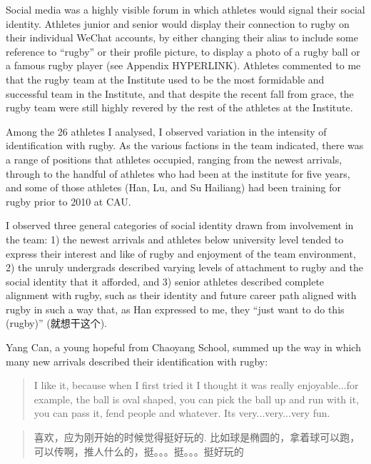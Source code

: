 \begin{CJK}{UTF8}{gbsn}
Social media was a highly visible forum in which athletes would signal their social identity.  Athletes junior and senior would display their connection to rugby on their individual WeChat accounts, by either changing their alias to include some reference to ``rugby'' or their profile picture, to display a photo of a rugby ball or a famous rugby player (see Appendix HYPERLINK).  Athletes commented to me that the rugby team at the Institute used to be the most formidable and successful team in the Institute, and that despite the recent fall from grace, the rugby team were still highly revered by the rest of the athletes at the Institute.

Among the 26 athletes I analysed, I observed variation in the intensity of identification with rugby.  As the various factions in the team indicated, there was a range of positions that athletes occupied, ranging from the newest arrivals, through to the handful of athletes who had been at the institute for five years, and some of those athletes (Han, Lu, and Su Hailiang) had been training for rugby prior to 2010 at CAU.

I observed three general categories of social identity drawn from involvement in the team: 1) the newest arrivals and athletes below university level tended to express their interest and like of rugby and enjoyment of the team environment, 2) the unruly undergrads described varying levels of attachment to rugby and the social identity that it afforded, and 3) senior athletes described complete alignment with rugby, such as their identity and future career path aligned with rugby in such a way that, as Han expressed to me, they ``just want to do this (rugby)'' (就想干这个).

Yang Can, a young hopeful from Chaoyang School, summed up the way in which many new arrivals described their identification with rugby:

      \begin{quotation}
        I like it, because when I first tried it I thought it was really enjoyable...for example, the ball is oval shaped, you can pick the ball up and run with it, you can pass it, fend people and whatever.  Its very...very...very fun.
      \end{quotation}

      \begin{quotation}
        喜欢，应为刚开始的时候觉得挺好玩的.	比如球是椭圆的，拿着球可以跑，可以传啊，推人什么的，挺。。。挺。。。挺好玩的 
      \end{quotation}


\end{CJK}
